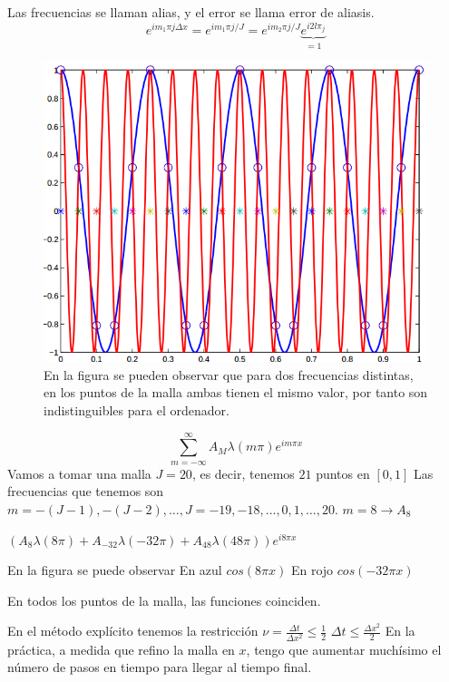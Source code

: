 Las frecuencias se llaman alias, y el error se llama error de aliasis.
\begin{equation*}
	e^{im_1\pi j\Delta x} = e^{im_1\pi j / J} = e^{im_2\pi j / J}\underbrace{e^{i2l\pi_j}}_{=1}
\end{equation*}

\begin{figure}[h]
	\centering
	\includegraphics[width=\textwidth/2]{img/frecmalla.png}
	\caption{En la figura se pueden observar que para dos frecuencias distintas, en los puntos de la malla ambas tienen el mismo valor, por tanto son indistinguibles para el ordenador.}
	\label{fig:frecmalla}
\end{figure}

\color{red}{DE AQUI HACIA ALANTE HAY QUE COMPLETAR} 
 \begin{example}
 	$$\sum_{m=-\infty}^\infty A_M\lambda(m\pi)e^{im\pi x}$$
	Vamos a tomar una malla $J=20$, es decir, tenemos $21$ puntos en $[0,1]$
	Las frecuencias que tenemos son
	$m = -(J-1), -(J-2), \hdots, J = -19, -18, \hdots, 0, 1, \hdots, 20$.
	$m = 8\to A_8$
	
	$(A_8\lambda(8\pi)+A_{-32}\lambda(-32\pi)+A_{48}\lambda(48\pi))
	e^{i8\pi x}$
	
	En la figura se puede observar
	En azul $cos(8\pi x)$
	En rojo $cos(-32\pi x)$
	
	En todos los puntos de la malla, las funciones coinciden.
 \end{example}
 
 En el método explícito tenemos la restricción $\nu=\frac{\Delta t}{\Delta x ^2} \le \frac{1}{2}$
 $\Delta t \le \frac{\Delta x ^2}{2}$ En la práctica, a medida que refino la malla en $x$, tengo que aumentar muchísimo el número de pasos en tiempo para llegar al tiempo final.
 

